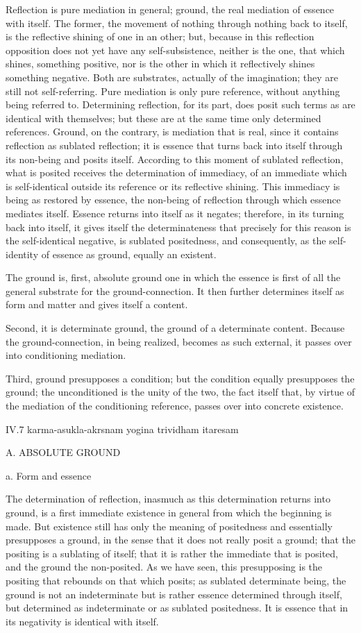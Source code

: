 Reflection is pure mediation in general;
ground, the real mediation of essence with itself.
The former, the movement of nothing through nothing back to itself,
is the reflective shining of one in an other;
but, because in this reflection opposition does not
yet have any self-subsistence,
neither is the one, that which shines, something positive,
nor is the other in which it reflectively shines something negative.
Both are substrates, actually of the imagination;
they are still not self-referring.
Pure mediation is only pure reference,
without anything being referred to.
Determining reflection, for its part, does posit
such terms as are identical with themselves;
but these are at the same time only determined references.
Ground, on the contrary, is mediation that is real,
since it contains reflection as sublated reflection;
it is essence that turns back into itself
through its non-being and posits itself.
According to this moment of sublated reflection,
what is posited receives the determination of immediacy,
of an immediate which is self-identical
outside its reference or its reflective shining.
This immediacy is being as restored by essence,
the non-being of reflection through which essence mediates itself.
Essence returns into itself as it negates;
therefore, in its turning back into itself,
it gives itself the determinateness that precisely
for this reason is the self-identical negative,
is sublated positedness, and consequently,
as the self-identity of essence as ground,
equally an existent.

The ground is, first, absolute ground
one in which the essence is first of all
the general substrate for the ground-connection.
It then further determines itself as form and matter
and gives itself a content.

Second, it is determinate ground,
the ground of a determinate content.
Because the ground-connection, in being realized,
becomes as such external,
it passes over into conditioning mediation.

Third, ground presupposes a condition;
but the condition equally presupposes the ground;
the unconditioned is the unity of the two,
the fact itself that, by virtue of
the mediation of the conditioning reference,
passes over into concrete existence.

IV.7
karma-asukla-akrsnam yogina trividham itaresam

A. ABSOLUTE GROUND

a. Form and essence

The determination of reflection,
inasmuch as this determination returns into ground,
is a first immediate existence in general
from which the beginning is made.
But existence still has only the meaning of positedness
and essentially presupposes a ground,
in the sense that it does not really posit a ground;
that the positing is a sublating of itself;
that it is rather the immediate that is posited,
and the ground the non-posited.
As we have seen, this presupposing is the positing
that rebounds on that which posits;
as sublated determinate being, the ground is not an indeterminate
but is rather essence determined through itself,
but determined as indeterminate or as sublated positedness.
It is essence that in its negativity is identical with itself.

